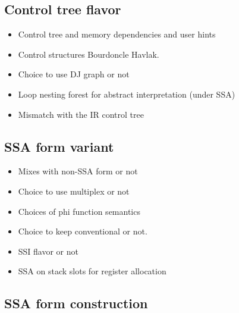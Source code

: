 \subsection{Control tree flavor}

\begin{itemize}

\item Control tree and memory dependencies and user hints

\item Control structures Bourdoncle Havlak.

\item Choice to use DJ graph or not

\item Loop nesting forest for abstract interpretation (under SSA)

\item Mismatch with the IR control tree

\end{itemize}

\subsection{SSA form variant}

\begin{itemize}

\item Mixes with non-SSA form or not

\item Choice to use multiplex or not

\item Choices of phi function semantics

\item Choice to keep conventional or not.

\item SSI flavor or not

\item SSA on stack slots for register allocation

\end{itemize}


\subsection{SSA form construction}

